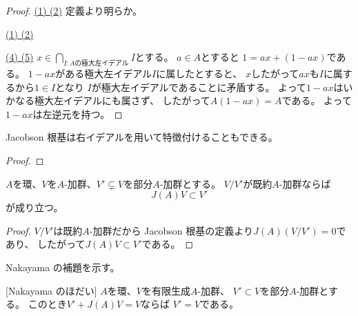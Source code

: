 \documentclass[report]{jlreq}
\begin{document}
\begin{proof}
    \uline{(1) \Leftrightarrow (2)} \quad
    定義より明らか。

    \uline{(1) \Rightarrow (2)} \quad
    \TODO{}

    \uline{(4) \Rightarrow (5)} \quad
    $x \in \bigcap_{I \colon \text{$A$の極大左イデアル}} I$とする。
    $a \in A$とすると
    $1 = ax + (1 - ax)$である。
    $1 - ax$がある極大左イデアル$I$に属したとすると、
    $x$したがって$ax$も$I$に属するから$1 \in I$となり
    $I$が極大左イデアルであることに矛盾する。
    よって$1 - ax$はいかなる極大左イデアルにも属さず、
    したがって$A (1 - ax) = A$である。
    よって$1 - ax$は左逆元を持つ。
\end{proof}

Jacobson 根基は右イデアルを用いて特徴付けることもできる。

\begin{proposition}
    \TODO{}
\end{proposition}

\begin{proof}
    \TODO{}
\end{proof}

\begin{lemma}
    $A$を環、$V$を$A$-加群、$V' \subsetneq V$を部分$A$-加群とする。
    $V / V'$が既約$A$-加群ならば
    \begin{equation}
        J(A) V \subset V'
    \end{equation}
    が成り立つ。
\end{lemma}

\begin{proof}
    $V / V'$は既約$A$-加群だから
    Jacobson 根基の定義より$J(A) (V / V') = 0$であり、
    したがって$J(A) V \subset V'$である。
\end{proof}

Nakayama の補題を示す。

\begin{theorem}
    [Nakayama のほだい]
    $A$を環、$V$を有限生成$A$-加群、
    $V' \subset V$を部分$A$-加群とする。
    このとき$V' + J(A) V = V$ならば
    $V' = V$である。
\end{theorem}


\end{document}

